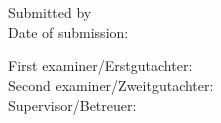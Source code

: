 \thispagestyle{empty}

\noindent\myTitle \\
\noindent\myDegree \\

\bigskip

\noindent Submitted by \myName \\
\noindent Date of submission:

\bigskip

\noindent  First examiner/Erstgutachter: \myProf \\
\noindent Second examiner/Zweitgutachter: \myOtherProf \\
\noindent Supervisor/Betreuer: \mySupervisor \\

\hfill

\vfill

\noindent \myUni \\
\noindent \myDepartment \\
\noindent \myFaculty \\


%
%
%
%
%

